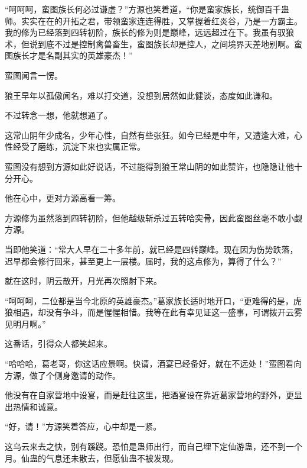 \begin{this_body}
“呵呵呵，蛮图族长何必过谦虚？”方源也笑着道，“你是蛮家族长，统御百千蛊师。实实在在的开拓之君，带领蛮家连连得胜，又掌握着红炎谷，乃是一方霸主。我的修为已经落到四转初阶，族长的修为则是巅峰，远远超过在下。我虽有驭狼术，但说到底不过是控制禽兽畜生，蛮图族长却是控人，之间境界天差地别啊。蛮图族长才是名副其实的英雄豪杰！”

蛮图闻言一愣。

狼王早年以孤傲闻名，难以打交道，没想到居然如此健谈，态度如此谦和。

不过转念一想，他就想通了。

这常山阴年少成名，少年心性，自然有些张狂。如今已经是中年，又遭逢大难，心性经受了磨练，沉淀下来也实属正常。

蛮图没有想到方源如此好说话，不过能得到狼王常山阴的如此赞许，也隐隐让他十分开心。

他在心中，更对方源高看一筹。

方源修为虽然落到四转初阶，但他越级斩杀过五转哈突骨，因此蛮图丝毫不敢小觑方源。

当即他笑道：“常大人早在二十多年前，就已经是四转巅峰。现在因为伤势跌落，迟早都会修行回来，甚至更上一层楼。届时，我的这点修为，算得了什么？”

就在这时，阴云散开，月光再次照射下来。

“呵呵呵，二位都是当今北原的英雄豪杰。”葛家族长适时地开口，“更难得的是，虎狼相遇，却没有争斗，而是惺惺相惜。我等在此有幸见证这一盛事，可谓拨开云雾见明月啊。”

这番话，引得众人都笑起来。

“哈哈哈，葛老哥，你这话应景啊。快请，酒宴已经备好，就在不远处！”蛮图看向方源，做了个侧身邀请的动作。

他没有在自家营地中设宴，而是赶往这里，把酒宴设在靠近葛家营地的野外，更显出热情和诚意。

“好，请！”方源笑着答应，心中却是一紧。

这乌云来去之快，别有蹊跷。恐怕是蛊师出行，而自己埋下定仙游蛊，还不到一个月。仙蛊的气息还未散去，但愿仙蛊不被发现。

\end{this_body}

